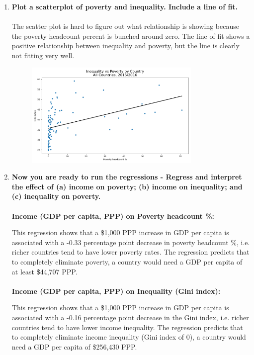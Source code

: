 \documentclass[12pt]{article}
\begin{document}
\begin{enumerate}
\begin{figure}[H]
    \end{figure}
    \item \textbf{Plot a scatterplot of poverty and inequality. Include a line of fit.}
    \\\\
    The scatter plot is hard to figure out what relationship is showing because the poverty headcount percent is bunched around zero. The line of fit shows a positive relationship between inequality and poverty, but the line is clearly not fitting very well.

    \begin{figure}[H]
        \centering
        \includegraphics[width=0.8\textwidth]{./output/Scatterplot Inequality vs Poverty.png}
    \end{figure}
    \item \textbf{Now you are ready to run the regressions - Regress and interpret the effect of (a) income on poverty; (b) income on inequality; and (c) inequality on poverty.}
    \\\\
    \textbf{Income (GDP per capita, PPP) on Poverty headcount \%:}
    \footnotesize
    
    \normalsize
    This regression shows that a \$1,000 PPP increase in GDP per capita is associated with a -0.33 percentage point decrease in poverty headcount \%, i.e. richer countries tend to have lower poverty rates. The regression predicts that to completely eliminate poverty, a country would need a GDP per capita of at least \$44,707 PPP.
    \\\\
    \textbf{Income (GDP per capita, PPP) on Inequality (Gini index):}
    \footnotesize
    
    \normalsize
    This regression shows that a \$1,000 PPP increase in GDP per capita is associated with a -0.16 percentage point decrease in the Gini index, i.e. richer countries tend to have lower income inequality. The regression predicts that to completely eliminate income inequality (Gini index of 0), a country would need a GDP per capita of \$256,430 PPP.

\end{enumerate}
\end{document}
